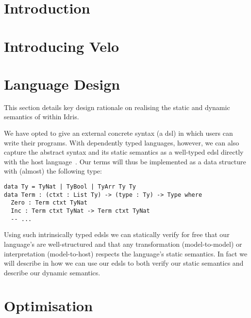 \documentclass[%
draft, %
a4paper,
UKenglish,
cleveref,
autoref,
thm-restate,
pdfa
]{oasics-v2021}
\begin{document}

\section{Introduction}
\label{sec:introduction}




\section{Introducing Velo}
\label{sec:velo}



\section{Language Design}
\label{sec:design}

This section details key design rationale on realising the static and dynamic semantics of \Velo{} within Idris.

We have opted to give \Velo{} an external concrete syntax (a \ac{dsl}) in which users can write their programs.
%
With dependently typed languages, however, we can also capture the abstract syntax and its static semantics as a well-typed \ac{edsl} directly with the host language~\cite{Augustsson1999edt}.
Our terms will thus be implemented as a data structure with (almost) the following type:

\begin{Verbatim}
data Ty = TyNat | TyBool | TyArr Ty Ty
data Term : (ctxt : List Ty) -> (type : Ty) -> Type where
  Zero : Term ctxt TyNat
  Inc : Term ctxt TyNat -> Term ctxt TyNat
  -- ...
\end{Verbatim}

\noindent

Using such intrinsically typed \acp{edsl} we can statically verify for free that our language's are well-structured and that any transformation (model-to-model) or interpretation (model-to-host) respects the language's static semantics.
In fact we will describe in  how we can use our \acp{edsl} to both verify our static semantics and describe our dynamic semantics.






\section{Optimisation}
\label{sec:compiler-pass}
\end{document}
